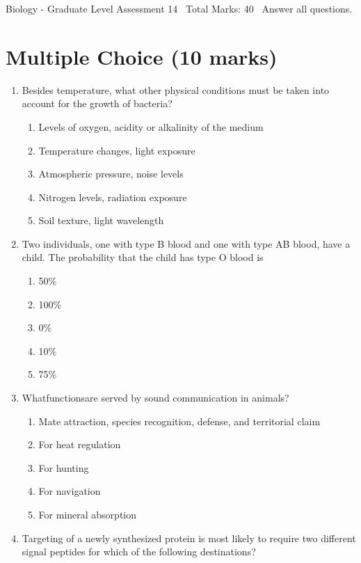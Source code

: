 \documentclass[12pt]{article}
\begin{document}
\begin{center}
Biology - Graduate Level Assessment 14 \
Total Marks: 40 \
Answer all questions.
\end{center}

\section*{Multiple Choice (10 marks)}
\begin{enumerate}[label=\arabic*.]
\item Besides temperature, what other physical conditions must be taken into account for the growth of bacteria?
\begin{enumerate}[label=(\alph*)]
    \item Levels of oxygen, acidity or alkalinity of the medium
    \item Temperature changes, light exposure
    \item Atmospheric pressure, noise levels
    \item Nitrogen levels, radiation exposure
    \item Soil texture, light wavelength
\end{enumerate}
\item Two individuals, one with type B blood and one with type AB blood, have a child. The probability that the child has type O blood is
\begin{enumerate}[label=(\alph*)]
    \item 50\%
    \item 100\%
    \item 0\%
    \item 10\%
    \item 75\%
\end{enumerate}
\item Whatfunctionsare served by sound communication in animals?
\begin{enumerate}[label=(\alph*)]
    \item Mate attraction, species recognition, defense, and territorial claim
    \item For heat regulation
    \item For hunting
    \item For navigation
    \item For mineral absorption
\end{enumerate}
\item Targeting of a newly synthesized protein is most likely to require two different signal peptides for which of the following destinations?

\end{enumerate}
\end{document}
